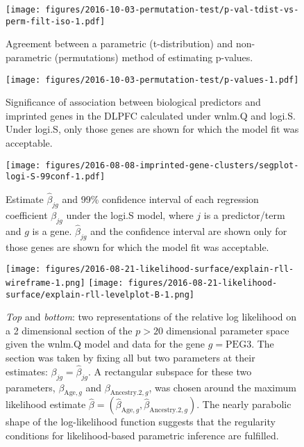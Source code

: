 \documentclass[12pt,letterpaper]{article}
\begin{document}
\begin{figure}[h]
\begin{center}
\texttt{[image: figures/2016-10-03-permutation-test/p-val-tdist-vs-perm-filt-iso-1.pdf]}
\end{center}
\caption{Agreement between a parametric (t-distribution) and non-parametric
(permutations) method of estimating p-values.}
\label{fig:pval-tdist-vs-perm}
\end{figure}

\begin{figure}[h]
\begin{center}
\texttt{[image: figures/2016-10-03-permutation-test/p-values-1.pdf]}
\end{center}
\caption{
Significance of association between biological predictors and imprinted genes
in the DLPFC calculated under wnlm.Q and logi.S.  Under logi.S, only those
genes are shown for which the model fit was acceptable.
}
\label{fig:pval}
\end{figure}

\begin{figure}[h]
\begin{center}
\texttt{[image: figures/2016-08-08-imprinted-gene-clusters/segplot-logi-S-99conf-1.pdf]}
\end{center}
\caption{
Estimate \(\hat{\beta}_{jg}\) and 99\% confidence interval of each regression coefficient
\(\beta_{jg}\) under the logi.S model, where \(j\) is a predictor/term and
\(g\) is a gene.  \(\hat{\beta}_{jg}\) and the confidence interval are shown only for those
genes are shown for which the model fit was acceptable.
}
\label{fig:biol-effects-logi.S}
\end{figure}

\begin{figure}[h]
\begin{center}
\texttt{[image: figures/2016-08-21-likelihood-surface/explain-rll-wireframe-1.png]}
\texttt{[image: figures/2016-08-21-likelihood-surface/explain-rll-levelplot-B-1.png]}
\end{center}
\caption{
\emph{Top} and \emph{bottom}: two representations of the relative log
likelihood on a 2 dimensional section of the \(p>20\) dimensional parameter
space given the wnlm.Q model and data for the gene \(g=\mathrm{PEG3}\).  The
section was taken by fixing all but two parameters at their estimates:
\(\beta_{jg} = \hat{\beta}_{jg}\).  A rectangular subspace for these two
parameters, \(\beta_{\mathrm{Age},g}\) and  \(\beta_{\mathrm{Ancestry.2},g}\),
was chosen around the maximum likelihood estimate \(\hat{\beta} =
(\hat{\beta}_{\mathrm{Age},g}, \hat{\beta}_{\mathrm{Ancestry.2},g})\).  The
nearly parabolic shape of the log-likelihood function suggests that the
regularity conditions for likelihood-based parametric inference are fulfilled.
}
\label{fig:ll-surf-explain}
\end{figure}
\end{document}
